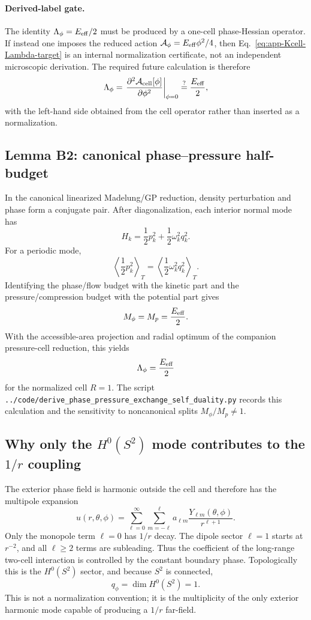 \documentclass[11pt]{article}
\begin{document}
\paragraph{Derived-label gate.}
The identity \(\Lambda_\phi=E_{\rm eff}/2\) must be produced by a one-cell
phase-Hessian operator.  If instead one imposes the reduced action
\(\mathcal A_\phi=E_{\rm eff}\phi^2/4\), then
Eq.~\eqref{eq:app-Kcell-Lambda-target} is an internal normalization certificate,
not an independent microscopic derivation.  The required future calculation is
therefore
\[
  \Lambda_\phi
  =
  \left.
  \frac{\partial^2\mathcal A_{\rm cell}[\phi]}
       {\partial\phi^2}
  \right|_{\phi=0}
  \stackrel{?}{=}
  \frac{E_{\rm eff}}{2},
\]
with the left-hand side obtained from the cell operator rather than inserted as
a normalization.



\subsection{Lemma B2: canonical phase--pressure half-budget}

In the canonical linearized Madelung/GP reduction, density perturbation and
phase form a conjugate pair.  After diagonalization, each interior normal mode
has
\[
  H_k=\frac12p_k^2+\frac12\omega_k^2q_k^2.
\]
For a periodic mode,
\[
  \left\langle\frac12p_k^2\right\rangle_T
  =
  \left\langle\frac12\omega_k^2q_k^2\right\rangle_T.
\]
Identifying the phase/flow budget with the kinetic part and the
pressure/compression budget with the potential part gives
\[
  M_\phi=M_p=\frac{E_{\rm eff}}2.
\]
With the accessible-area projection and radial optimum of the companion
pressure-cell reduction, this yields
\[
  \Lambda_\phi=\frac{E_{\rm eff}}2
\]
for the normalized cell \(R=1\).  The script
\texttt{../code/derive\_phase\_pressure\_exchange\_self\_duality.py} records
this calculation and the sensitivity to noncanonical splits \(M_\phi/M_p\ne1\).

\subsection{Why only the \(H^0(S^2)\) mode contributes to the \(1/r\) coupling}

The exterior phase field is harmonic outside the cell and therefore has the
multipole expansion
\[
  u(r,\theta,\phi)
  =
  \sum_{\ell=0}^{\infty}\sum_{m=-\ell}^{\ell}
  a_{\ell m}
  \frac{Y_{\ell m}(\theta,\phi)}{r^{\ell+1}}.
\]
Only the monopole term \(\ell=0\) has \(1/r\) decay.  The dipole sector
\(\ell=1\) starts at \(r^{-2}\), and all \(\ell\ge2\) terms are subleading.
Thus the coefficient of the long-range two-cell interaction is controlled by
the constant boundary phase.  Topologically this is the \(H^0(S^2)\) sector,
and because \(S^2\) is connected,
\[
  q_\phi=\dim H^0(S^2)=1.
\]
This is not a normalization convention; it is the multiplicity of the only
exterior harmonic mode capable of producing a \(1/r\) far-field.
\end{document}
